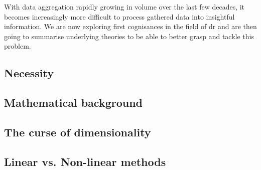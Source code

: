 With data aggregation rapidly growing in volume over the last few decades, it becomes increasingly more difficult to process gathered data into insightful information.
We are now exploring first cognisances in the field of \acrlong{dr} and are then going to summarise underlying theories to be able to better grasp and tackle this problem.


\subsection{Necessity}

\clearpage




\subsection{Mathematical background}

\clearpage


\subsection{The curse of dimensionality} \label{curseOfDimensionality}

\vfill
\clearpage


\subsection{Linear vs. Non-linear methods}

\clearpage
